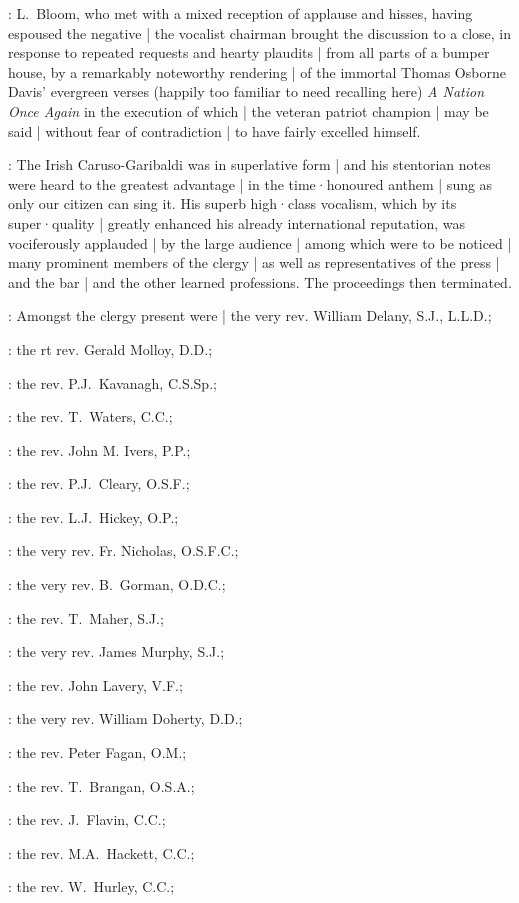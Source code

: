 :
L.~Bloom,
who met with a mixed reception of applause and hisses,
having espoused the negative |
the vocalist chairman brought the discussion to a close,
in response to repeated requests and hearty plaudits |
from all parts of a bumper house,
by a remarkably noteworthy rendering |
of the immortal Thomas Osborne Davis' evergreen verses
(happily too familiar to need recalling here)
\emph{A Nation Once Again}
in the execution of which |
the veteran patriot champion |
may be said |
without fear of contradiction |
to have fairly excelled himself.

:
The Irish Caruso-Garibaldi was in superlative form
 |
and his stentorian notes were heard to the greatest advantage |
in the time·honoured anthem |
sung as only our citizen can sing it.
His superb high·class vocalism,
which by its super·quality |
greatly enhanced his already international reputation,
was vociferously applauded |
by the large audience |
among which were to be noticed |
many prominent members of the clergy |
as well as representatives of the press |
and the bar |
and the other learned professions.
The proceedings then terminated.

:
Amongst the clergy present were |
the very rev. William Delany, S.J., L.L.D.;

:
the rt rev. Gerald Molloy, D.D.;

:
the rev. P.J.~Kavanagh, C.S.Sp.;

:
the rev. T.~Waters, C.C.;

:
the rev. John M. Ivers, P.P.;

:
the rev. P.J.~Cleary, O.S.F.;

:
the rev. L.J.~Hickey, O.P.;

:
the very rev. Fr. Nicholas, O.S.F.C.;

:
the very rev. B.~Gorman, O.D.C.;

:
the rev. T.~Maher, S.J.;

:
the very rev. James Murphy, S.J.;

:
the rev. John Lavery, V.F.;

:
the very rev. William Doherty, D.D.;

:
the rev. Peter Fagan, O.M.;

:
the rev. T.~Brangan, O.S.A.;

:
the rev. J.~Flavin, C.C.;

:
the rev. M.A.~Hackett, C.C.;

:
the rev. W.~Hurley, C.C.;


